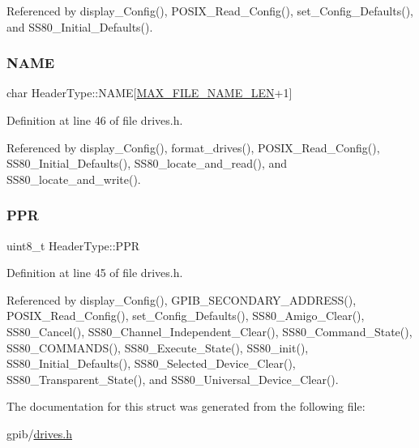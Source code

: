 Referenced by display\+\_\+\+Config(), P\+O\+S\+I\+X\+\_\+\+Read\+\_\+\+Config(), set\+\_\+\+Config\+\_\+\+Defaults(), and S\+S80\+\_\+\+Initial\+\_\+\+Defaults().

\mbox{\label{structHeaderType_aac997fd2dc536b10072137ecaf1fd0b4}} 
\subsubsection{\texorpdfstring{N\+A\+ME}{NAME}}
{\footnotesize\ttfamily char Header\+Type\+::\+N\+A\+ME\mbox{[}\hyperlink{drives_8h_a835262f9c26026aab5f91a528f57ad8f}{M\+A\+X\+\_\+\+F\+I\+L\+E\+\_\+\+N\+A\+M\+E\+\_\+\+L\+EN}+1\mbox{]}}



Definition at line 46 of file drives.\+h.



Referenced by display\+\_\+\+Config(), format\+\_\+drives(), P\+O\+S\+I\+X\+\_\+\+Read\+\_\+\+Config(), S\+S80\+\_\+\+Initial\+\_\+\+Defaults(), S\+S80\+\_\+locate\+\_\+and\+\_\+read(), and S\+S80\+\_\+locate\+\_\+and\+\_\+write().

\mbox{\label{structHeaderType_ac642cdad0f3874495afa0ab687a56fd0}} 
\subsubsection{\texorpdfstring{P\+PR}{PPR}}
{\footnotesize\ttfamily uint8\+\_\+t Header\+Type\+::\+P\+PR}



Definition at line 45 of file drives.\+h.



Referenced by display\+\_\+\+Config(), G\+P\+I\+B\+\_\+\+S\+E\+C\+O\+N\+D\+A\+R\+Y\+\_\+\+A\+D\+D\+R\+E\+S\+S(), P\+O\+S\+I\+X\+\_\+\+Read\+\_\+\+Config(), set\+\_\+\+Config\+\_\+\+Defaults(), S\+S80\+\_\+\+Amigo\+\_\+\+Clear(), S\+S80\+\_\+\+Cancel(), S\+S80\+\_\+\+Channel\+\_\+\+Independent\+\_\+\+Clear(), S\+S80\+\_\+\+Command\+\_\+\+State(), S\+S80\+\_\+\+C\+O\+M\+M\+A\+N\+D\+S(), S\+S80\+\_\+\+Execute\+\_\+\+State(), S\+S80\+\_\+init(), S\+S80\+\_\+\+Initial\+\_\+\+Defaults(), S\+S80\+\_\+\+Selected\+\_\+\+Device\+\_\+\+Clear(), S\+S80\+\_\+\+Transparent\+\_\+\+State(), and S\+S80\+\_\+\+Universal\+\_\+\+Device\+\_\+\+Clear().



The documentation for this struct was generated from the following file\+:\begin{DoxyCompactItemize}
\item 
gpib/\hyperlink{drives_8h}{drives.\+h}\end{DoxyCompactItemize}
